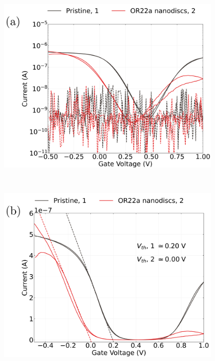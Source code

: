 \documentclass[
  a4paper,
]{scrbook}
\begin{document}
\begin{figure}

\begin{minipage}[t]{0.47\linewidth}

{\centering 

\includegraphics{figures/ch8/Q1C6_ch7_absolute_values_with_gate_current_edited.png}
{}

}

\end{minipage}%
%
\begin{minipage}[t]{0.05\linewidth}

{\centering 

~

}

\end{minipage}%
%
\begin{minipage}[t]{0.47\linewidth}

{\centering 

\includegraphics{figures/ch8/Q1C6_ch7_absolute_values_with_threshold_voltage_shift_without_gate_current_edited.png}
{}

}
\end{minipage}
\end{figure}
\end{document}
